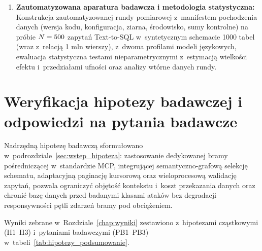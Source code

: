 \begin{enumerate}
    \item \textbf{Zautomatyzowana aparatura badawcza i metodologia statystyczna:} Konstrukcja zautomatyzowanej rundy pomiarowej z~manifestem pochodzenia danych (wersja kodu, konfiguracja, ziarna, środowisko, sumy kontrolne) na próbie $N = 500$ zapytań Text-to-SQL w~syntetycznym schemacie 1000 tabel (wraz z~relacją 1 mln wierszy), z~dwoma profilami modeli językowych, ewaluacja statystyczna testami nieparametrycznymi z~estymacją wielkości efektu i~przedziałami ufności oraz analizy wtórne danych rundy.
\end{enumerate}


\section{Weryfikacja hipotezy badawczej i odpowiedzi na pytania badawcze}
\label{sec:podsumowanie_hipoteza}

Nadrzędną hipotezę badawczą sformułowano w~podrozdziale~\ref{sec:wstep_hipoteza}: zastosowanie dedykowanej bramy pośredniczącej w~standardzie MCP, integrującej semantyczno-grafową selekcję schematu, adaptacyjną paginację kursorową oraz wieloprocesową walidację zapytań, pozwala ograniczyć objętość kontekstu i~koszt przekazania danych oraz chronić bazę danych przed badanymi klasami ataków bez degradacji responsywności pętli zdarzeń bramy pod obciążeniem.

Wyniki zebrane w~Rozdziale~\ref{chap:wyniki} zestawiono z~hipotezami cząstkowymi (H1--H3) i~pytaniami badawczymi (PB1--PB3) w~tabeli~\ref{tab:hipotezy_podsumowanie}.

